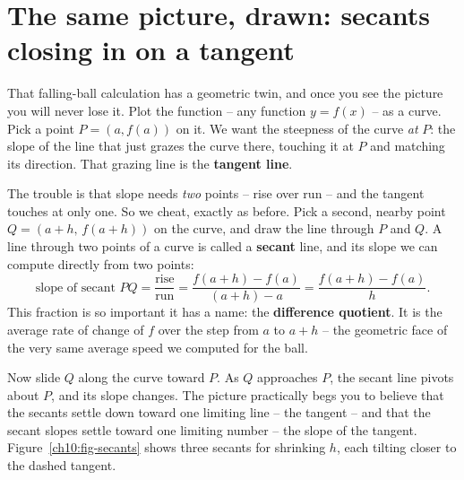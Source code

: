 \section{The same picture, drawn: secants closing in on a tangent}
\label{ch10:secant-tangent}

That falling-ball calculation has a geometric twin, and once you see the picture
you will never lose it. Plot the function -- any function $y = f(x)$ -- as a curve.
Pick a point $P = (a, f(a))$ on it. We want the steepness of the curve \emph{at}
$P$: the slope of the line that just grazes the curve there, touching it at $P$
and matching its direction. That grazing line is the \textbf{tangent line}.

The trouble is that slope needs \emph{two} points -- rise over run -- and the
tangent touches at only one. So we cheat, exactly as before. Pick a second,
nearby point $Q = (a + h,\, f(a + h))$ on the curve, and draw the line through
$P$ and $Q$. A line through two points of a curve is called a \textbf{secant}
line, and its slope we can compute directly from two points:
\[
  \text{slope of secant } PQ
  = \frac{\text{rise}}{\text{run}}
  = \frac{f(a + h) - f(a)}{(a + h) - a}
  = \frac{f(a + h) - f(a)}{h}.
\]
This fraction is so important it has a name: the \textbf{difference quotient}.
It is the average rate of change of $f$ over the step from $a$ to $a + h$ -- the
geometric face of the very same average speed we computed for the ball.

Now slide $Q$ along the curve toward $P$. As $Q$ approaches $P$, the secant line
pivots about $P$, and its slope changes. The picture practically begs you to
believe that the secants settle down toward one limiting line -- the tangent --
and that the secant slopes settle toward one limiting number -- the slope of the
tangent. Figure~\ref{ch10:fig-secants} shows three secants for shrinking $h$,
each tilting closer to the dashed tangent.

